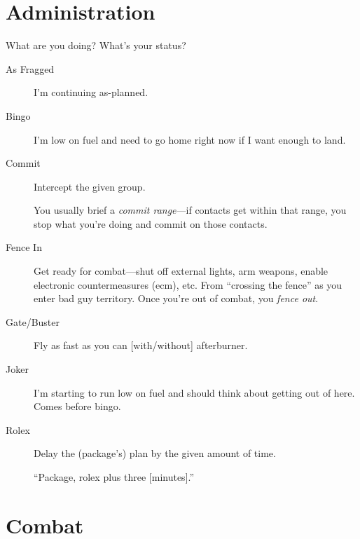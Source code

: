 \section{Administration}

What are you doing? What's your status?
\begin{description}

\item[As Fragged] I'm continuing as-planned.

\item[Bingo] I'm low on fuel and need to go home right now if I want enough
    to land.

\item[Commit] Intercept the given group.

    You usually brief a \emph{commit range}---if contacts get within that range,
    you stop what you're doing and commit on those contacts.

\item[Fence In] Get ready for combat---shut off external lights,
    arm weapons, enable electronic countermeasures \ac{(ecm)}, etc.
    From ``crossing the fence'' as you enter bad guy territory.
    Once you're out of combat, you \emph{fence out}.

\item[Gate/Buster] Fly as fast as you can [with/without] afterburner.

\item[Joker] I'm starting to run low on fuel and should think about getting
    out of here. Comes before bingo.

\item[Rolex] Delay the (package's) plan by the given amount of time.

    ``Package, rolex plus three [minutes].''
\end{description}

\section{Combat}

